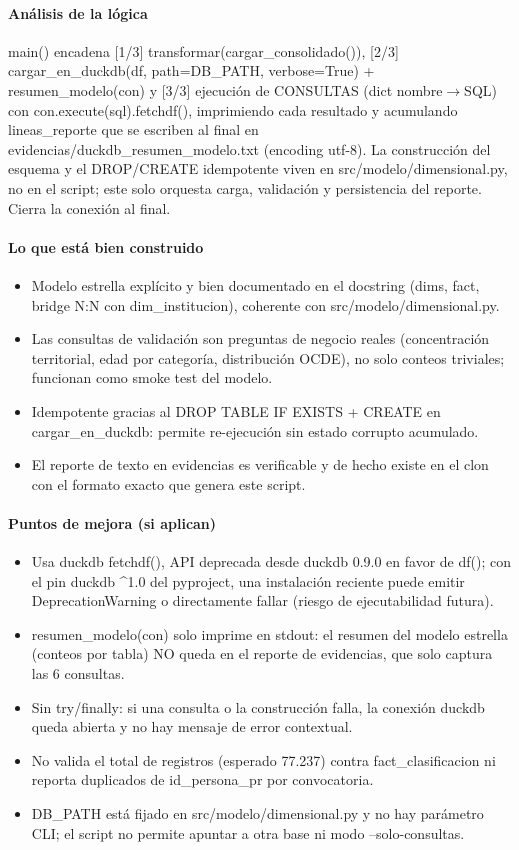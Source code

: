 \paragraph{Análisis de la lógica}
main() encadena [1/3] transformar(cargar\_consolidado()), [2/3] cargar\_en\_duckdb(df, path=DB\_PATH, verbose=True) + resumen\_modelo(con) y [3/3] ejecución de CONSULTAS (dict nombre$\rightarrow$SQL) con con.execute(sql).fetchdf(), imprimiendo cada resultado y acumulando lineas\_reporte que se escriben al final en evidencias/duckdb\_resumen\_modelo.txt (encoding utf-8). La construcción del esquema y el DROP/CREATE idempotente viven en src/modelo/dimensional.py, no en el script; este solo orquesta carga, validación y persistencia del reporte. Cierra la conexión al final.

\paragraph{Lo que está bien construido}
\begin{itemize}
  \item Modelo estrella explícito y bien documentado en el docstring (dims, fact, bridge N:N con dim\_institucion), coherente con src/modelo/dimensional.py.
  \item Las consultas de validación son preguntas de negocio reales (concentración territorial, edad por categoría, distribución OCDE), no solo conteos triviales; funcionan como smoke test del modelo.
  \item Idempotente gracias al DROP TABLE IF EXISTS + CREATE en cargar\_en\_duckdb: permite re-ejecución sin estado corrupto acumulado.
  \item El reporte de texto en evidencias es verificable y de hecho existe en el clon con el formato exacto que genera este script.
\end{itemize}

\paragraph{Puntos de mejora (si aplican)}
\begin{itemize}
  \item Usa duckdb fetchdf(), API deprecada desde duckdb 0.9.0 en favor de df(); con el pin duckdb \textasciicircum{}1.0 del pyproject, una instalación reciente puede emitir DeprecationWarning o directamente fallar (riesgo de ejecutabilidad futura).
  \item resumen\_modelo(con) solo imprime en stdout: el resumen del modelo estrella (conteos por tabla) NO queda en el reporte de evidencias, que solo captura las 6 consultas.
  \item Sin try/finally: si una consulta o la construcción falla, la conexión duckdb queda abierta y no hay mensaje de error contextual.
  \item No valida el total de registros (esperado 77.237) contra fact\_clasificacion ni reporta duplicados de id\_persona\_pr por convocatoria.
  \item DB\_PATH está fijado en src/modelo/dimensional.py y no hay parámetro CLI; el script no permite apuntar a otra base ni modo --solo-consultas.
\end{itemize}

